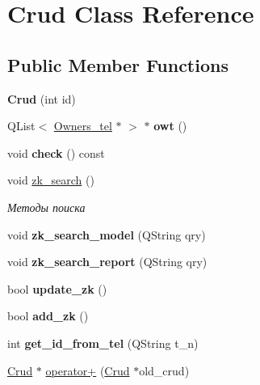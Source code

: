 \hypertarget{class_crud}{}\section{Crud Class Reference}
\label{class_crud}
\subsection*{Public Member Functions}
\begin{DoxyCompactItemize}
\item 
\mbox{\label{class_crud_ab1b032ddce73af707f1d283414074cca}} 
{\bfseries Crud} (int id)
\item 
\mbox{\label{class_crud_a0167c0fe3031ac629426b1fc9b2288f2}} 
Q\+List$<$ \mbox{\hyperlink{class_owners__tel}{Owners\+\_\+tel}} $\ast$ $>$ $\ast$ {\bfseries owt} ()
\item 
\mbox{\label{class_crud_a17d474d9ca07ccee3a6de9452ad08d62}} 
void {\bfseries check} () const
\item 
\mbox{\label{class_crud_af717e374ecb6625bbb51b63577af18ec}} 
void \mbox{\hyperlink{class_crud_af717e374ecb6625bbb51b63577af18ec}{zk\+\_\+search}} ()
\begin{DoxyCompactList}\small\item\em Методы поиска \end{DoxyCompactList}\item 
\mbox{\label{class_crud_a637d1db391e21a26db705149db135add}} 
void {\bfseries zk\+\_\+search\+\_\+model} (Q\+String qry)
\item 
\mbox{\label{class_crud_a42c953223673c83842c070bd6dd0a503}} 
void {\bfseries zk\+\_\+search\+\_\+report} (Q\+String qry)
\item 
\mbox{\label{class_crud_a85ef151024ce3a1a8a020c26f08c7aa7}} 
bool {\bfseries update\+\_\+zk} ()
\item 
\mbox{\label{class_crud_ad2820c9aefd9e0bd5ef38a9b879c758e}} 
bool {\bfseries add\+\_\+zk} ()
\item 
\mbox{\label{class_crud_af100617f4930a3958d65402482b30905}} 
int {\bfseries get\+\_\+id\+\_\+from\+\_\+tel} (Q\+String t\+\_\+n)
\item 
\mbox{\hyperlink{class_crud}{Crud}} $\ast$ \mbox{\hyperlink{class_crud_a51806494ff098d94e1a8c553cadda0c6}{operator+}} (\mbox{\hyperlink{class_crud}{Crud}} $\ast$old\+\_\+crud)
\end{DoxyCompactItemize}
